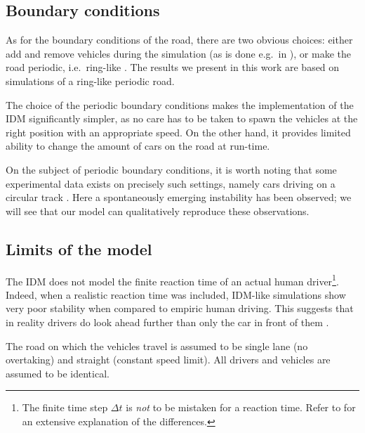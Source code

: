 \subsection{Boundary conditions}
As for the boundary conditions of the road, there are two obvious choices: either add and remove vehicles during the simulation (as is done e.g.\ in \cite{treiber1999}), or make the road periodic, i.e.\ ring-like \cite{treiber2015}. The results we present in this work are based on simulations of a ring-like periodic road.

The choice of the periodic boundary conditions makes the implementation of the IDM significantly simpler, as no care has to be taken to spawn the vehicles at the right position with an appropriate speed. On the other hand, it provides limited ability to change the amount of cars on the road at run-time.

On the subject of periodic boundary conditions, it is worth noting that some experimental data exists on precisely such settings, namely cars driving on a circular track \cite{nakayama2009,tadaki2013}. Here a spontaneously emerging instability has been observed; we will see that our model can qualitatively reproduce these observations.


\subsection{Limits of the model}
The IDM does not model the finite reaction time of an actual human driver\footnote{The finite time step $\Delta t$ is \emph{not} to be mistaken for a reaction time. Refer to \cite{treiber2006} for an extensive explanation of the differences.}. Indeed, when a realistic reaction time was included, IDM-like simulations show very poor stability when compared to empiric human driving. This suggests that in reality drivers do look ahead further than only the car in front of them \cite{treiber2006}.

The road on which the vehicles travel is assumed to be single lane (no overtaking) and straight (constant speed limit). All drivers and vehicles are assumed to be identical.

